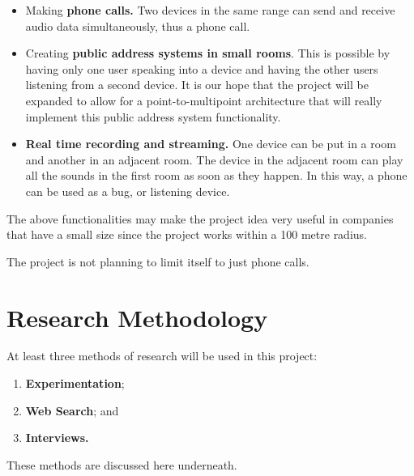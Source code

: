 \documentclass[12pt,svgnames,smaller]{article} %
\begin{document}
	\begin{itemize}
		\item Making \textbf{phone calls.} Two devices in the same range can send and receive audio data simultaneously, thus a phone call. 
		\item Creating \textbf{public address systems in small rooms}. This is possible by having only one user speaking into a device and having the other users listening from a second device. It is our hope that the project will be expanded to allow for a point-to-multipoint architecture that will really implement this public address system functionality.
		\item \textbf{Real time recording and streaming.} One device can be put in a room and another in an adjacent room. The device in the adjacent room can play all the sounds in the first room as soon as they happen. In this way, a phone can be used as a bug, or listening device.
	\end{itemize}
	
	The above functionalities may make the project idea very useful in companies that have a small size since the project works within a 100 metre radius.
	
	The project is not planning to limit itself to just phone calls.
	

	\newpage
	\section{\textbf{ Research Methodology} } 
	
	At least three methods of research will be used in this project:
	
	\begin{enumerate}
		\item \textbf{Experimentation};
		\item \textbf{Web Search}; and
		\item \textbf{Interviews.}
	\end{enumerate}
	
	These methods are discussed here underneath.
	
\end{document}
